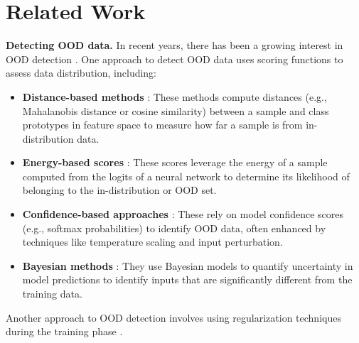 \section{Related Work}
\label{sec:related works}
\vspace{-0.1cm}

\textbf{Detecting OOD data.}
In recent years, there has been a growing interest in OOD detection \citep{fort2021exploring, yang2024generalized, NEURIPS2022_f0e91b13, galil2023a, djurisic2023extremely, zheng2023out, wang2023outofdistribution, zhu2023diversified, bai2023feed, ming2024does, ghosal2024overcome}. 
One approach to detect OOD data uses scoring functions to assess data distribution, including:

\vspace{-0.2cm}
\begin{itemize}
    \vspace{-0.2cm}
    \item \textbf{Distance-based methods} \citep{NEURIPS2018_abdeb6f5, NEURIPS2020_8965f766, ren2021simple, NEURIPS2022_804dbf8d, ming2023how}: 
    These methods compute distances (e.g., Mahalanobis distance or cosine similarity) between a sample and class prototypes in feature space to measure how far a sample is from in-distribution data.
    \vspace{-0.2cm}
    \item \textbf{Energy-based scores} \citep{NEURIPS2020_f5496252, wu2023energybased}: These scores leverage the energy of a sample computed from the logits of a neural network to determine its likelihood of belonging to the in-distribution or OOD set.
    \vspace{-0.2cm}
    \item \textbf{Confidence-based approaches} \citep{bendale2016towards, hendrycks2017a, liang2018enhancing}:
   These rely on model confidence scores (e.g., softmax probabilities) to identify OOD data, often enhanced by techniques like temperature scaling and input perturbation.
    \vspace{-0.2cm}
    \item \textbf{Bayesian methods} \citep{pmlr-v48-gal16, NIPS2017_9ef2ed4b, NEURIPS2019_7dd2ae7d, Wen2020BatchEnsemble}: 
    They use Bayesian models to quantify uncertainty in model predictions to identify inputs that are significantly different from the training data.
\end{itemize}
\vspace{-0.4cm}
Another approach to OOD detection involves using regularization techniques during the training phase \citep{NEURIPS2018_3ea2db50, pmlr-v97-geifman19a, NEURIPS2020_28e209b6, yang2021semantically, pmlr-v162-wei22d, du2022unknown, NEURIPS2023_bf5311df, NEURIPS2023_e812af67}.
